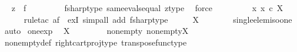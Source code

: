 \begin{isabellebody}
\ \isamarkupfalse%
\ {\isachardoublequoteopen}z\ {\isacharequal}{\kern0pt}\ f\isactrlsup {\isasymsharp}{\isachardoublequoteclose}\isanewline
\ \ \ \ \ \ \isamarkupfalse%
\ \ fsharp{\isacharunderscore}{\kern0pt}type\ same{\isacharunderscore}{\kern0pt}evals{\isacharunderscore}{\kern0pt}equal\ z{\isacharunderscore}{\kern0pt}type\ \isamarkupfalse%
\ force\isanewline
\ \ \isamarkupfalse%
\isanewline
\ \ \isamarkupfalse%
\ \isamarkupfalse%
\ {\isachardoublequoteopen}{\isasymexists}{\isacharbang}{\kern0pt}\ x{\isachardot}{\kern0pt}\ x\ {\isasymin}\isactrlsub c\ X\isactrlbsup {\isasymemptyset}\isactrlesup {\isachardoublequoteclose}\isanewline
\ \ \ \ \isamarkupfalse%
\ {\isacharparenleft}{\kern0pt}rule{\isacharunderscore}{\kern0pt}tac\ a{\isacharequal}{\kern0pt}{\isachardoublequoteopen}f\isactrlsup {\isasymsharp}{\isachardoublequoteclose}\ \ ex{}I{\isacharcomma}{\kern0pt}\ simp{\isacharunderscore}{\kern0pt}all\ add{\isacharcolon}{\kern0pt}\ fsharp{\isacharunderscore}{\kern0pt}type{\isacharparenright}{\kern0pt}\isanewline
\ \ \isamarkupfalse%
\ \isamarkupfalse%
\ {\isachardoublequoteopen}X\isactrlbsup {\isasymemptyset}\isactrlesup \ {\isasymcong}\ {\isasymone}{\isachardoublequoteclose}\isanewline
\ \ \ \ \isamarkupfalse%
\ single{\isacharunderscore}{\kern0pt}elem{\isacharunderscore}{\kern0pt}iso{\isacharunderscore}{\kern0pt}one\ \isamarkupfalse%
\ auto\isanewline
{}\isamarkupfalse%
%
\endisatagproof
{\isafoldproof}%
%
\isadelimproof
\isanewline
%
\endisadelimproof
\isanewline
{}\isamarkupfalse%
\ one{\isacharunderscore}{\kern0pt}exp{\isacharcolon}{\kern0pt}\isanewline
\ \ {\isachardoublequoteopen}{\isasymone}\isactrlbsup X\isactrlesup \ {\isasymcong}\ {\isasymone}{\isachardoublequoteclose}\isanewline
%
\isadelimproof
%
\endisadelimproof
%
\isatagproof
{}\isamarkupfalse%
\ {\isacharminus}{\kern0pt}\ \isanewline
\ \ \isamarkupfalse%
\ nonempty{\isacharcolon}{\kern0pt}\ {\isachardoublequoteopen}nonempty{\isacharparenleft}{\kern0pt}{\isasymone}\isactrlbsup X\isactrlesup {\isacharparenright}{\kern0pt}{\isachardoublequoteclose}\isanewline
\ \ \ \ \isamarkupfalse%
\ nonempty{\isacharunderscore}{\kern0pt}def\ right{\isacharunderscore}{\kern0pt}cart{\isacharunderscore}{\kern0pt}proj{\isacharunderscore}{\kern0pt}type\ transpose{\isacharunderscore}{\kern0pt}func{\isacharunderscore}{\kern0pt}type\ \isamarkupfalse%

\end{isabellebody}
